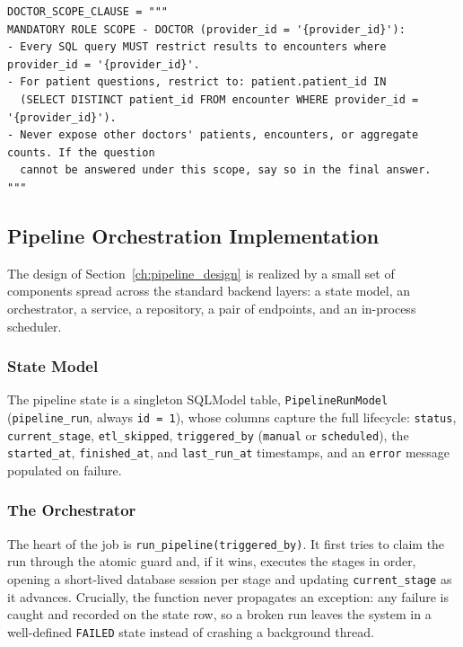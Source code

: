 \begin{lstlisting}[style=pythonstyle]
DOCTOR_SCOPE_CLAUSE = """
MANDATORY ROLE SCOPE - DOCTOR (provider_id = '{provider_id}'):
- Every SQL query MUST restrict results to encounters where provider_id = '{provider_id}'.
- For patient questions, restrict to: patient.patient_id IN
  (SELECT DISTINCT patient_id FROM encounter WHERE provider_id = '{provider_id}').
- Never expose other doctors' patients, encounters, or aggregate counts. If the question
  cannot be answered under this scope, say so in the final answer.
"""
\end{lstlisting}

\subsection{Pipeline Orchestration Implementation}
\label{ch:pipeline_impl}

The design of Section~\ref{ch:pipeline_design} is realized by a small set of components spread across the standard backend layers: a state model, an orchestrator, a service, a repository, a pair of endpoints, and an in-process scheduler.

\subsubsection*{State Model}

The pipeline state is a singleton SQLModel table, \texttt{PipelineRunModel} (\texttt{pipeline\_run}, always \texttt{id = 1}), whose columns capture the full lifecycle: \texttt{status}, \texttt{current\_stage}, \texttt{etl\_skipped}, \texttt{triggered\_by} (\texttt{manual} or \texttt{scheduled}), the \texttt{started\_at}, \texttt{finished\_at}, and \texttt{last\_run\_at} timestamps, and an \texttt{error} message populated on failure.

\subsubsection*{The Orchestrator}

The heart of the job is \texttt{run\_pipeline(triggered\_by)}. It first tries to claim the run through the atomic guard and, if it wins, executes the stages in order, opening a short-lived database session per stage and updating \texttt{current\_stage} as it advances. Crucially, the function never propagates an exception: any failure is caught and recorded on the state row, so a broken run leaves the system in a well-defined \texttt{FAILED} state instead of crashing a background thread.

